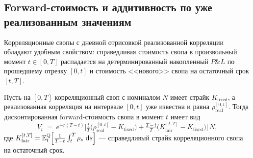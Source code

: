 \subsection{Forward-стоимость и аддитивность по уже реализованным
            значениям}
\label{sec:corr-fv}

Корреляционные свопы с дневной отрисовкой реализованной корреляции
обладают удобным свойством: справедливая стоимость свопа в произвольный
момент $t\in[0,T]$ распадается на детерминированный накопленный $P\&L$
по прошедшему отрезку $[0,t]$ и стоимость <<нового>> свопа на
остаточный срок $[t,T]$.

\begin{proposition}
\label{prop:corr-decomp}
Пусть на $[0,T]$ корреляционный своп с номиналом $N$ имеет страйк
$K_{\text{fixed}}$, а реализованная корреляция на интервале $[0,t]$ уже
известна и равна $\rho^{[0,t]}_{\text{real}}$. Тогда дисконтированная
forward-стоимость свопа в момент $t$ имеет вид
\begin{equation}
\label{eq:corr-decomp}
  V_t \;=\; e^{-r(T-t)}\biggl[
    \tfrac{t}{T}\bigl(\rho^{[0,t]}_{\text{real}}-K_{\text{fixed}}\bigr)
    + \tfrac{T-t}{T}\bigl(K_{\text{fair}}^{[t,T]}-K_{\text{fixed}}\bigr)
  \biggr]\,N,
\end{equation}
где $K_{\text{fair}}^{[t,T]} = \mathbb{E}_t^{\mathbb{Q}}\!\left[\tfrac{1}{T-t}\int_t^T\rho_s\,\,\mathrm{d} s\right]$
--- справедливый страйк корреляционного свопа на остаточный срок.
\end{proposition}

